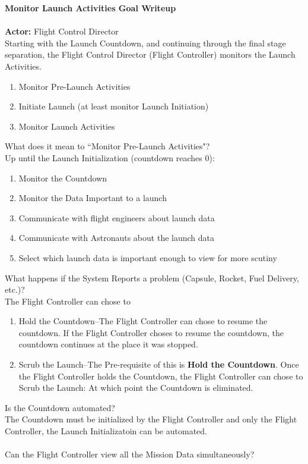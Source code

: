 \documentclass[letterpaper]{article}
\begin{document}
\noindent
\textbf{Monitor Launch Activities Goal Writeup}\\\\
\textbf{Actor:  }Flight Control Director\\
Starting with the Launch Countdown, and continuing through the final
stage separation, the Flight Control Director (Flight Controller)
monitors the Launch Activities.
\begin{enumerate}
\item Monitor Pre-Launch Activities
\item Initiate Launch (at least monitor Launch Initiation)
\item Monitor Launch Activities
\end{enumerate}
What does it mean to ``Monitor Pre-Launch Activities"?\\
Up until the Launch Initialization (countdown reaches 0):
\begin{enumerate}
\item Monitor the Countdown
\item Monitor the Data Important to a launch
\item Communicate with flight engineers about launch data
\item Communicate with Astronauts about the launch data
\item Select which launch data is important enough to view for more
scutiny
\end{enumerate}
What happens if the System Reports a problem (Capsule, Rocket,
Fuel Delivery, etc.)?\\
The Flight Controller can chose to
\begin{enumerate}
\item Hold the Countdown--The Flight Controller can chose to resume
the countdown.  If the Flight Controller choses to resume the
countdown,
the countdown continues at the place it was stopped.
\item Scrub the Launch--The Pre-requisite of this is \textbf{Hold the
Countdown}.  Once the Flight Controller holds the Countdown, the
Flight Controller can chose to Scrub the Launch:  At which point the
Countdown is eliminated.
\end{enumerate}
Is the Countdown automated?\\
The Countdown must be initialized by the Flight Controller and only the
Flight Controller,  the Launch Initializatoin can be automated.\\\\
Can the Flight Controller view all the Mission Data simultaneously?\\
\end{document}

